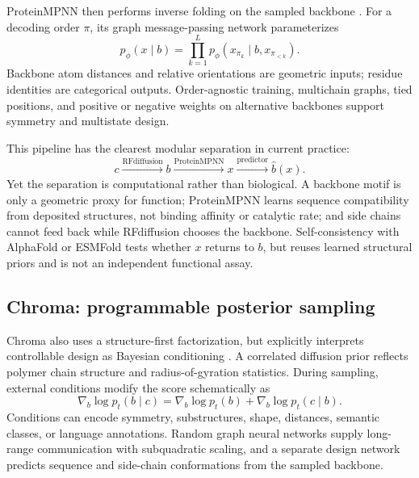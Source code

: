 \documentclass[10pt]{article}
\begin{document}
ProteinMPNN then performs inverse folding on the sampled backbone \cite{dauparas2022}.  For a
decoding order $\pi$, its graph message-passing network parameterizes
\begin{equation}
p_{\phi}(x\mid b)
=\prod_{k=1}^{L}
p_{\phi}(x_{\pi_k}\mid b,x_{\pi_{<k}}).
\label{eq:proteinmpnn}
\end{equation}
Backbone atom distances and relative orientations are geometric inputs; residue identities are
categorical outputs.  Order-agnostic training, multichain graphs, tied positions, and positive or
negative weights on alternative backbones support symmetry and multistate design.

This pipeline has the clearest modular separation in current practice:
\begin{equation}
c\xrightarrow{\mathrm{RFdiffusion}}b
\xrightarrow{\mathrm{ProteinMPNN}}x
\xrightarrow{\mathrm{predictor}}\widehat b(x).
\label{eq:rfdiffusion-pipeline}
\end{equation}
Yet the separation is computational rather than biological.  A backbone motif is only a geometric
proxy for function; ProteinMPNN learns sequence compatibility from deposited structures, not
binding affinity or catalytic rate; and side chains cannot feed back while RFdiffusion chooses the
backbone.  Self-consistency with AlphaFold or ESMFold tests whether $x$ returns to $b$, but reuses
learned structural priors and is not an independent functional assay.

\subsection{Chroma: programmable posterior sampling}

Chroma also uses a structure-first factorization, but explicitly interprets controllable design as
Bayesian conditioning \cite{ingraham2023}.  A correlated diffusion prior reflects polymer chain
structure and radius-of-gyration statistics.  During sampling, external conditions modify the score
schematically as
\begin{equation}
\nabla_b\log p_t(b\mid c)
=\nabla_b\log p_t(b)
+\nabla_b\log p_t(c\mid b).
\label{eq:chroma-guidance}
\end{equation}
Conditions can encode symmetry, substructures, shape, distances, semantic classes, or language
annotations.  Random graph neural networks supply long-range communication with subquadratic
scaling, and a separate design network predicts sequence and side-chain conformations from the
sampled backbone.
\end{document}
